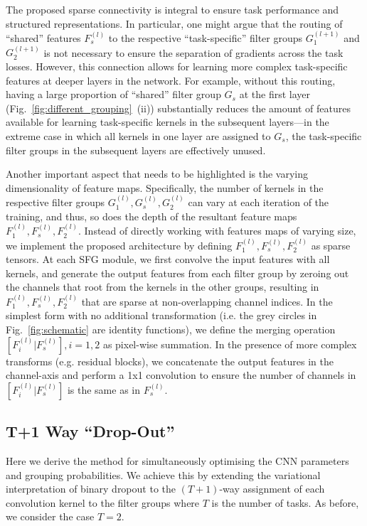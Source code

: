     
The proposed sparse connectivity is integral to ensure task performance and structured representations. In particular, one might argue that the routing of ``shared'' features $F^{(l)}_{s}$ to the respective ``task-specific'' filter groups $G^{(l+1)}_{1}$ and $G^{(l+1)}_{2}$ is not necessary to ensure the separation of gradients across the task losses. However, this connection allows for learning more complex task-specific features at deeper layers in the network. For example, without this routing, having a large proportion of ``shared'' filter group $G_{s}$ at the first layer (Fig.~\ref{fig:different_grouping}~(ii)) substantially reduces the amount of features available for learning task-specific kernels in the subsequent layers---in the extreme case in which all kernels in one layer are assigned to $G_{s}$, the task-specific filter groups in the subsequent layers are effectively unused. 

Another important aspect that needs to be highlighted is the varying dimensionality of feature maps. Specifically, the number of kernels in the respective filter groups $G^{(l)}_{1}, G^{(l)}_{s}, G^{(l)}_{2}$ can vary at each iteration of the training, and thus, so does the depth of the resultant feature maps $F^{(l)}_{1}, F^{(l)}_{s}, F^{(l)}_{2}$. Instead of directly working with features maps of varying size, we implement the proposed architecture by defining $F^{(l)}_{1}, F^{(l)}_{s}, F^{(l)}_{2}$ as sparse tensors. At each SFG module, we first convolve the input features with all kernels, and generate the output features from each filter group by zeroing out the channels that root from the kernels in the other groups, resulting in $F^{(l)}_{1}, F^{(l)}_{s}, F^{(l)}_{2}$ that are sparse at non-overlapping channel indices. In the simplest form with no additional transformation (i.e. the grey circles in Fig.~\ref{fig:schematic} are identity functions), we define the merging operation $[F^{(l)}_{i}|F^{(l)}_{s}], i = 1,2$ as pixel-wise summation. In the presence of more complex transforms (e.g. residual blocks), we concatenate the output features in the channel-axis and perform a 1x1 convolution to ensure the number of channels in $[F^{(l)}_{i}|F^{(l)}_{s}]$ is the same as in $F^{(l)}_{s}$. 


\subsection{T+1 Way ``Drop-Out''}
Here we derive the method for simultaneously optimising the CNN parameters and grouping probabilities. We achieve this by extending the variational interpretation of binary dropout \cite{gal2016uncertainty,gal2017concrete} to the $(T+1)$-way assignment of each convolution kernel to the filter groups where $T$ is the number of tasks. As before, we consider the case $T=2$. 

